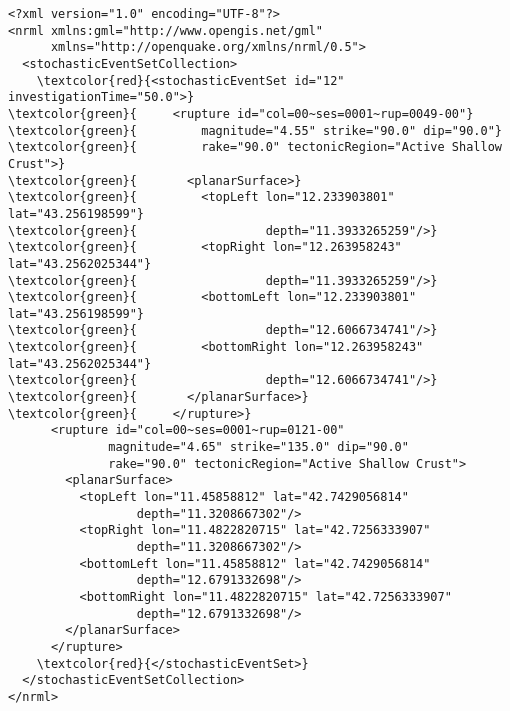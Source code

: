 \begin{Verbatim}[frame=single, commandchars=\\\{\}, fontsize=\small]
<?xml version="1.0" encoding="UTF-8"?>
<nrml xmlns:gml="http://www.opengis.net/gml"
	  xmlns="http://openquake.org/xmlns/nrml/0.5">
  <stochasticEventSetCollection>
    \textcolor{red}{<stochasticEventSet id="12" investigationTime="50.0">}
\textcolor{green}{     <rupture id="col=00~ses=0001~rup=0049-00"}
\textcolor{green}{         magnitude="4.55" strike="90.0" dip="90.0"}
\textcolor{green}{         rake="90.0" tectonicRegion="Active Shallow Crust">}
\textcolor{green}{       <planarSurface>}
\textcolor{green}{         <topLeft lon="12.233903801" lat="43.256198599"}
\textcolor{green}{                  depth="11.3933265259"/>}
\textcolor{green}{         <topRight lon="12.263958243" lat="43.2562025344"}
\textcolor{green}{                  depth="11.3933265259"/>}
\textcolor{green}{         <bottomLeft lon="12.233903801" lat="43.256198599"}
\textcolor{green}{                  depth="12.6066734741"/>}
\textcolor{green}{         <bottomRight lon="12.263958243" lat="43.2562025344"}
\textcolor{green}{                  depth="12.6066734741"/>}
\textcolor{green}{       </planarSurface>}
\textcolor{green}{     </rupture>}
      <rupture id="col=00~ses=0001~rup=0121-00"
              magnitude="4.65" strike="135.0" dip="90.0"
              rake="90.0" tectonicRegion="Active Shallow Crust">
        <planarSurface>
          <topLeft lon="11.45858812" lat="42.7429056814"
                  depth="11.3208667302"/>
          <topRight lon="11.4822820715" lat="42.7256333907"
                  depth="11.3208667302"/>
          <bottomLeft lon="11.45858812" lat="42.7429056814"
                  depth="12.6791332698"/>
          <bottomRight lon="11.4822820715" lat="42.7256333907"
                  depth="12.6791332698"/>
        </planarSurface>
      </rupture>
    \textcolor{red}{</stochasticEventSet>}
  </stochasticEventSetCollection>
</nrml>
\end{Verbatim}
